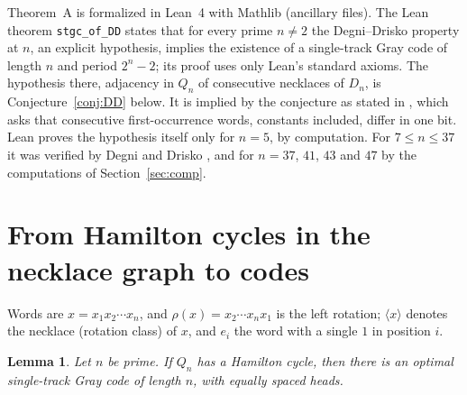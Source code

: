 \documentclass[11pt]{article}
\newtheorem{lemma}{Lemma}
\begin{document}
Theorem~A is formalized in Lean~4 with Mathlib (ancillary files). The Lean theorem \texttt{stgc\_of\_DD} states that for
every prime $n\ne 2$ the Degni--Drisko property at $n$, an explicit hypothesis, implies the existence of a single-track
Gray code of length $n$ and period $2^n-2$; its proof uses only Lean's standard axioms. The hypothesis there, adjacency in
$Q_n$ of consecutive necklaces of $D_n$, is Conjecture~\ref{conj:DD} below. It is implied by the conjecture as stated in
\cite{DD07}, which asks that consecutive first-occurrence words, constants included, differ in one bit. Lean proves the
hypothesis itself only for $n=5$, by computation. For $7\le n\le 37$ it was verified by Degni and Drisko
\cite{DD07}, and for $n=37$, $41$, $43$ and $47$ by the computations of Section~\ref{sec:comp}.

\section{From Hamilton cycles in the necklace graph to codes}

Words are $x=x_1x_2\cdots x_n$, and $\rho(x)=x_2\cdots x_nx_1$ is the left rotation; $\langle x\rangle$ denotes the
necklace (rotation class) of $x$, and $e_i$ the word with a single $1$ in position $i$.

\begin{lemma}\label{lem:V}
Let $n$ be prime. If $Q_n$ has a Hamilton cycle, then there is an optimal single-track Gray code of length $n$, with
equally spaced heads.
\end{lemma}
\end{document}
